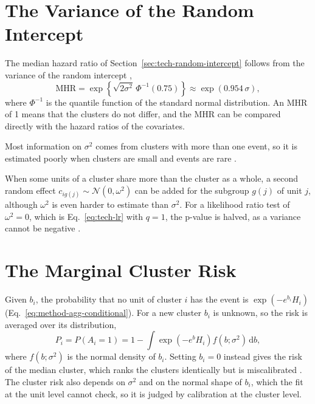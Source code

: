 \section{The Variance of the Random Intercept}
\label{app:glmm-variance}

The median hazard ratio of Section~\ref{sec:tech-random-intercept} follows from the variance of the random intercept \cite{austin2017mhr},
\begin{equation}
  \mathrm{MHR} = \exp\!\left\{\sqrt{2\sigma^2}\,\Phi^{-1}(0.75)\right\} \approx \exp(0.954\,\sigma),
  \label{eq:tech-mhr}
\end{equation}
where $\Phi^{-1}$ is the quantile function of the standard normal distribution.
An MHR of 1 means that the clusters do not differ, and the MHR can be compared directly with the hazard ratios of the covariates.

Most information on $\sigma^2$ comes from clusters with more than one event, so it is estimated poorly when clusters are small and events are rare \cite{moineddin2007multilevel, austin2010clusters}.

\label{sec:tech-nested}%
When some units of a cluster share more than the cluster as a whole, a second random effect $c_{ig(j)} \sim \mathcal{N}(0, \omega^2)$ can be added for the subgroup $g(j)$ of unit $j$, although $\omega^2$ is even harder to estimate than $\sigma^2$.
For a likelihood ratio test of $\omega^2 = 0$, which is Eq.~\eqref{eq:tech-lr} with $q = 1$, the p-value is halved, as a variance cannot be negative \cite{self1987boundary, stram1994variance}.

\section{The Marginal Cluster Risk}
\label{app:glmm-risk}

Given $b_i$, the probability that no unit of cluster $i$ has the event is $\exp(-e^{b_i} H_i)$ (Eq.~\eqref{eq:method-agg-conditional}).
For a new cluster $b_i$ is unknown, so the risk is averaged over its distribution,
\begin{equation}
  P_i = P(A_i = 1) = 1 - \int \exp\!\left(-e^{b} H_i\right) f(b;\sigma^2)\,\mathrm{d}b ,
  \label{eq:tech-agg-marginal}
\end{equation}
where $f(b;\sigma^2)$ is the normal density of $b_i$.
Setting $b_i = 0$ instead gives the risk of the median cluster, which ranks the clusters identically but is miscalibrated \cite{pavlou2015marginal, skrondal2009prediction}.
The cluster risk also depends on $\sigma^2$ and on the normal shape of $b_i$, which the fit at the unit level cannot check, so it is judged by calibration at the cluster level.
